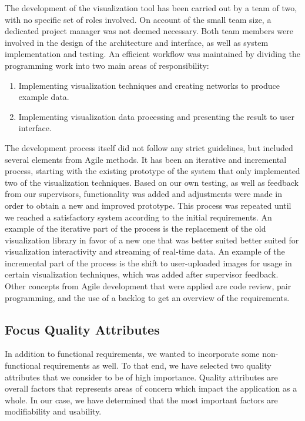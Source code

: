 The development of the visualization tool has been carried out by a team of two, with no specific set of roles involved. On account of the small team size, a dedicated project manager was not deemed necessary. Both team members were involved in the design of the architecture and interface, as well as system implementation and testing. An efficient workflow was maintained by dividing the programming work into two main areas of responsibility:
\begin{enumerate}
    \item Implementing visualization techniques and creating networks to produce example data.
    \item Implementing visualization data processing and presenting the result to user interface.
\end{enumerate} %

\noindent The development process itself did not follow any strict guidelines, but included several elements from Agile methods. It has been an iterative and incremental process, starting with the existing prototype of the system that only implemented two of the visualization techniques. Based on our own testing, as well as feedback from our supervisors, functionality was added and adjustments were made in order to obtain a new and improved prototype. This process was repeated until we reached a satisfactory system according to the initial requirements. An example of the iterative part of the process is the replacement of the old visualization library in favor of a new one that was better suited better suited for visualization interactivity and streaming of real-time data. An example of the incremental part of the process is the shift to user-uploaded images for usage in certain visualization techniques, which was added after supervisor feedback. Other concepts from Agile development that were applied are code review, pair programming, and the use of a backlog to get an overview of the requirements.

\subsection{Focus Quality Attributes}

In addition to functional requirements, we wanted to incorporate some non-functional requirements as well. To that end, we have selected two quality attributes that we consider to be of high importance. Quality attributes are overall factors that represents areas of concern which impact the application as a whole. In our case, we have determined that the most important factors are modifiability and usability.


